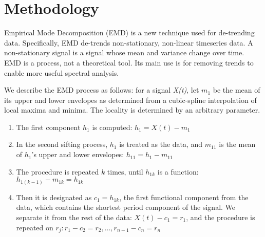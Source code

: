 


\section{Methodology}\label{method}

Empirical Mode Decomposition (EMD) \cite{huang:emd1998} is a new technique used for de-trending data.
Specifically, EMD de-trends non-stationary, non-linear timeseries data.  
A non-stationary signal is a signal whose mean and
variance change over time.  EMD is a process, not a theoretical tool.  Its main use is for removing trends 
to enable more useful spectral analysis.

We describe the EMD process as follows:  for a signal \emph{X(t)}, let $m_1$ be the mean of its upper and
lower envelopes as determined from a cubic-spline interpolation of local maxima and minima. The locality 
is determined by an arbitrary parameter.

\begin{enumerate}
\item The first component $h_1$ is computed: $h_1=X(t)-m_1$
\item In the second sifting process, $h_1$ is treated as the data, and $m_{11}$ is the mean of $h_1$'s upper and lower envelopes: $h_{11}=h_1-m_{11}$
\item The procedure is repeated $k$ times, until $h_{1k}$ is a function: $h_{1(k-1)}-m_{1k}=h_{1k}$
\item Then it is designated as $c_1=h_{1k}$, the first functional component from the data, which contains the shortest period component of the signal. We separate it from the rest of the data: $X(t)-c_1 = r_1$, and the procedure is
repeated on $r_j: r_1-c_2 = r_2,\dots,r_{n-1} - c_n = r_n$
\end{enumerate}

